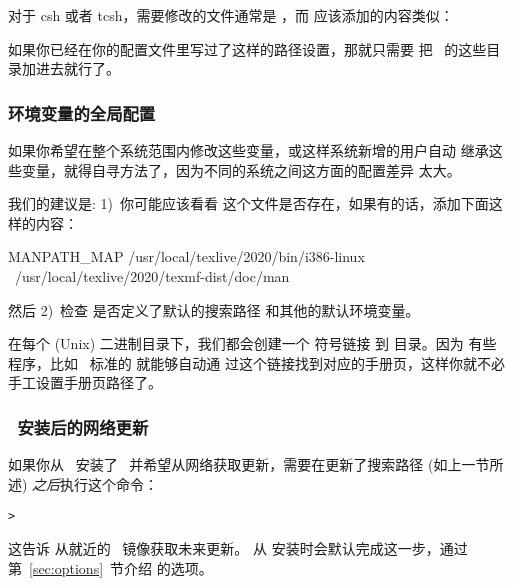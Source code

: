 \documentclass{article}
\begin{document}
对于 csh 或者 tcsh，需要修改的文件通常是 ，而
应该添加的内容类似：


如果你已经在你的配置文件里写过了这样的路径设置，那就只需要
把 \TL\ 的这些目录加进去就行了。

\subsubsection{环境变量的全局配置}
\label{sec:envglobal}

如果你希望在整个系统范围内修改这些变量，或这样系统新增的用户自动
继承这些变量，就得自寻方法了，因为不同的系统之间这方面的配置差异
太大。

我们的建议是: 1)~你可能应该看看 
这个文件是否存在，如果有的话，添加下面这样的内容：

\begin{sverbatim}
  MANPATH_MAP /usr/local/texlive/2020/bin/i386-linux \
  /usr/local/texlive/2020/texmf-dist/doc/man
\end{sverbatim}

然后 2)~检查  是否定义了默认的搜索路径
和其他的默认环境变量。

在每个 (Unix) 二进制目录下，我们都会创建一个  符号链接
到  目录。因为
有些 \code{man} 程序，比如 \MacOSX\ 标准的  就能够自动通
过这个链接找到对应的手册页，这样你就不必手工设置手册页路径了。

\subsubsection{\DVD\ 安装后的网络更新}
\label{sec:dvd-install-net-updates}

如果你从 \DVD\ 安装了 \TL\ 并希望从网络获取更新，需要在更新了搜索路径
(如上一节所述) \emph{之后}执行这个命令：

\begin{alltt}
  > 
\end{alltt}

这告诉  从就近的 \CTAN\ 镜像获取未来更新。
从 \DVD{} 安装时会默认完成这一步，通过第~\ref{sec:options}~节介绍
的选项。
\end{document}

